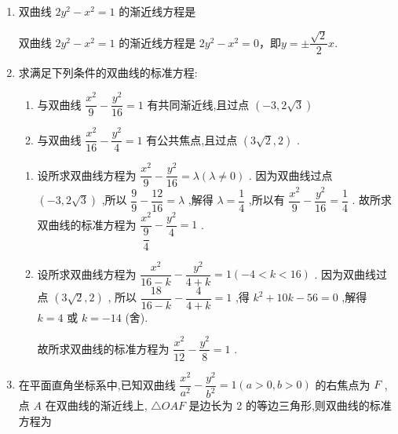 \begin{enumerate}
\begin{jieda}
        所以 ${e}^{2} \leq  2$ ,所以 $1 < e \leq  \sqrt{2}$ .
    \end{jieda}
    \item 双曲线 $2{y}^{2} - {x}^{2} = 1$ 的渐近线方程是

    \begin{jieda}
        双曲线 $2{y}^{2} - {x}^{2} = 1$ 的渐近线方程是 $2{y}^{2} - {x}^{2} = 0$，即$y =  \pm  \dfrac{\sqrt{2}}{2}x$.
    \end{jieda}


    \item 求满足下列条件的双曲线的标准方程:
    \begin{enumerate}
        \item 与双曲线 $\dfrac{{x}^{2}}{9} - \dfrac{{y}^{2}}{16} = 1$ 有共同渐近线,且过点 $\left( {-3,2\sqrt{3}}\right)$
        \item 与双曲线 $\dfrac{{x}^{2}}{16} - \dfrac{{y}^{2}}{4} = 1$ 有公共焦点,且过点 $\left( {3\sqrt{2},2}\right)$ .
    \end{enumerate}
    \begin{jieda}
        \begin{enumerate}
            \item 设所求双曲线方程为 $\dfrac{{x}^{2}}{9} - \dfrac{{y}^{2}}{16} = \lambda \left( {\lambda  \neq  0}\right)$ . 因为双曲线过点 $\left( {-3,2\sqrt{3}}\right)$ ,所以 $\dfrac{9}{9} - \dfrac{12}{16} = \lambda$ ,解得 $\lambda  = \dfrac{1}{4}$ ,所以有 $\dfrac{{x}^{2}}{9} - \dfrac{{y}^{2}}{16} = \dfrac{1}{4}$ . 故所求双曲线的标准方程为 $\dfrac{{x}^{2}}{\dfrac{9}{4}} - \dfrac{{y}^{2}}{4} = 1$ .
            \item 设所求双曲线方程为 $\dfrac{{x}^{2}}{{16} - k} - \dfrac{{y}^{2}}{4 + k} = 1\left( {-4 < k < {16}}\right)$ . 因为双曲线过点 $\left( {3\sqrt{2},2}\right)$ , 所以 $\dfrac{18}{{16} - k} - \dfrac{4}{4 + k} = 1$ ,得 ${k}^{2} + {10k} - {56} = 0$ ,解得 $k = 4$ 或 $k =  - {14}$ (舍).
            
            故所求双曲线的标准方程为 $\dfrac{{x}^{2}}{12} - \dfrac{{y}^{2}}{8} = 1$ .
        \end{enumerate}
    \end{jieda}
    
    \item 在平面直角坐标系中,已知双曲线 $\dfrac{{x}^{2}}{{a}^{2}} - \dfrac{{y}^{2}}{{b}^{2}} = 1\left( {a > 0,b > 0}\right)$ 的右焦点为 $F$ ,点 $A$ 在双曲线的渐近线上, $\bigtriangleup {OAF}$ 是边长为 2 的等边三角形,则双曲线的标准方程为
    

\end{enumerate}
